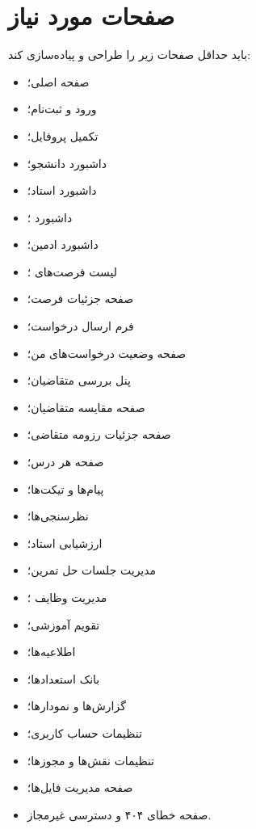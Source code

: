 \documentclass[12pt,a4paper]{article}
\begin{document}
\section{صفحات مورد نیاز}
 باید حداقل صفحات زیر را طراحی و پیاده‌سازی کند:
\begin{itemize}
\item صفحه اصلی؛
\item ورود و ثبت‌نام؛
\item تکمیل پروفایل؛
\item داشبورد دانشجو؛
\item داشبورد استاد؛
\item داشبورد ؛
\item داشبورد ادمین؛
\item لیست فرصت‌های ؛
\item صفحه جزئیات فرصت؛
\item فرم ارسال درخواست؛
\item صفحه وضعیت درخواست‌های من؛
\item پنل بررسی متقاضیان؛
\item صفحه مقایسه متقاضیان؛
\item صفحه جزئیات رزومه متقاضی؛
\item صفحه هر درس؛
\item پیام‌ها و تیکت‌ها؛
\item نظرسنجی‌ها؛
\item ارزشیابی استاد؛
\item مدیریت جلسات حل تمرین؛
\item مدیریت وظایف ؛
\item تقویم آموزشی؛
\item اطلاعیه‌ها؛
\item بانک استعدادها؛
\item گزارش‌ها و نمودارها؛
\item تنظیمات حساب کاربری؛
\item تنظیمات نقش‌ها و مجوزها؛
\item صفحه مدیریت فایل‌ها؛
\item صفحه خطای ۴۰۴ و دسترسی غیرمجاز.
\end{itemize}
\end{document}
